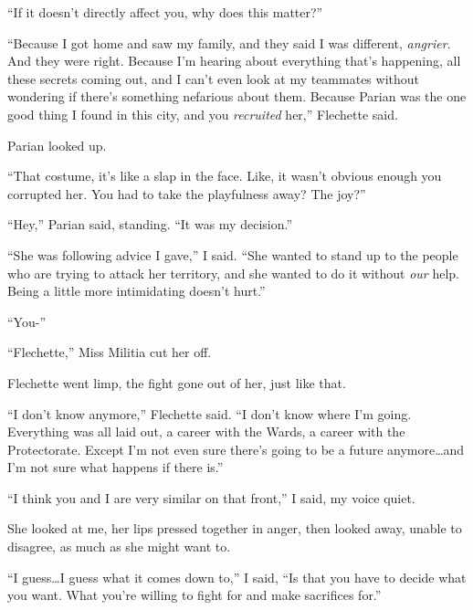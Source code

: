``If it doesn't directly affect you, why does this matter?''



``Because I got home and saw my family, and they said I was different, \emph{angrier}.  And they were right.  Because I'm hearing about everything that's happening, all these secrets coming out, and I can't even look at my teammates without wondering if there's something nefarious about them.  Because Parian was the one good thing I found in this city, and you \emph{recruited} her,'' Flechette said.



Parian looked up.



``That costume, it's like a slap in the face.  Like, it wasn't obvious enough you corrupted her.  You had to take the playfulness away?  The joy?''



``Hey,'' Parian said, standing.  ``It was my decision.''



``She was following advice I gave,'' I said.  ``She wanted to stand up to the people who are trying to attack her territory, and she wanted to do it without \emph{our} help.  Being a little more intimidating doesn't hurt.''



``You-''



``Flechette,'' Miss Militia cut her off.



Flechette went limp, the fight gone out of her, just like that.



``I don't know anymore,'' Flechette said.  ``I don't know where I'm going.  Everything was all laid out, a career with the Wards, a career with the Protectorate.  Except I'm not even sure there's going to be a future anymore\ldots and I'm not sure what happens if there is.''



``I think you and I are very similar on that front,'' I said, my voice quiet.



She looked at me, her lips pressed together in anger, then looked away, unable to disagree, as much as she might want to.



``I guess\ldots I guess what it comes down to,'' I said, ``Is that you have to decide what you want.  What you're willing to fight for and make sacrifices for.''



